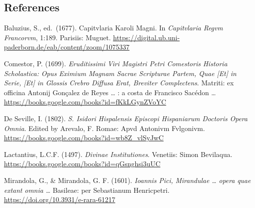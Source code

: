 \documentclass[
]{article}
\begin{document}
\hypertarget{references}{%
\subsection{References}\label{references}}

Baluzius, S., ed.~(1677). Capitvlaria Karoli Magni. In \emph{Capitvlaria
Regvm Francorvm}, 1:189. Parisiis: Muguet.
\url{https://digital.ub.uni-paderborn.de/eab/content/zoom/1075337}

Comestor, P. (1699). \emph{Eruditissimi Viri Magistri Petri Comestoris
Historia Scholastica: Opus Eximium Magnam Sacrae Scripturae Partem, Quae
{[}Et{]} in Serie, {[}Et{]} in Glossis Crebro Diffusa Erat, Breviter
Complectens}. Matriti: ex officina Antonij Gonçalez de Reyes \ldots{} :
a costa de Francisco Sacédon \ldots{}
\url{https://books.google.com/books?id=fKkLGynZVoYC}

De Seville, I. (1802). \emph{S. Isidori Hispalensis Episcopi Hispaniarum
Doctoris Opera Omnia}. Edited by Arevalo, F. Romae: Apvd Antonivm
Fvlgonivm. \url{https://books.google.com/books?id=wb8Z_vlSyJwC}

Lactantius, L.C.F. (1497). \emph{Divinae Institutiones}. Venetiis: Simon
Bevilaqua. \url{https://books.google.com/books?id=qGsnghsi3uUC}

Mirandola, G., \& Mirandola, G. F. (1601). \emph{Ioannis Pici,
Mirandulae \ldots{} opera quae extant omnia \ldots{}} Basileae: per
Sebastianum Henricpetri. \url{https://doi.org/10.3931/e-rara-61217}
\end{document}
